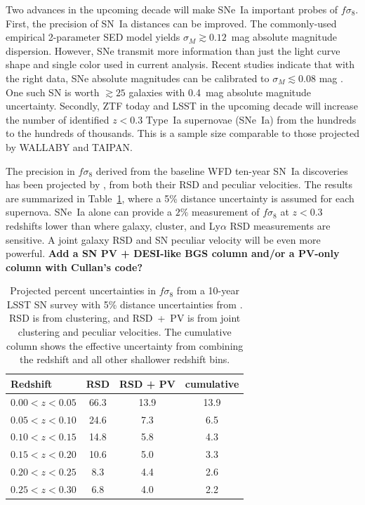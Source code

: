 \documentclass{aastex62}   	%
\begin{document}
Two advances in the upcoming decade will make SNe~Ia  important probes of $f\sigma_8$.
First, the precision of SN~Ia distances can be improved.  The commonly-used empirical 2-parameter SED model yields $\sigma_M \gtrsim 0.12$~mag absolute magnitude
dispersion.  However, SNe transmit more information than just the light curve shape and single color used in current analysis.
Recent studies indicate that with the right data, SNe absolute
magnitudes can be calibrated to $\sigma_M \lesssim 0.08$ mag \citep[see e.g.][]{2012MNRAS.425.1007B, 2015ApJ...815...58F}.
One such SN is worth $\gtrsim 25$ galaxies with 0.4~mag absolute magnitude uncertainty.
Secondly,  ZTF today and LSST in the upcoming decade will increase the number of identified  $z<0.3$ Type~Ia supernovae (SNe~Ia)  from the hundreds to the
hundreds of thousands.  This is a sample size comparable to those projected by WALLABY and TAIPAN.

The precision in  $f\sigma_8$ derived from the baseline WFD ten-year SN~Ia discoveries has been projected by \citet{2017ApJ...847..128H},
from both their RSD and peculiar velocities.
The results are summarized in Table~\ref{tab:howlett}, where a 5\% distance uncertainty is assumed for each supernova.
SNe~Ia alone can provide a $2\%$ measurement of $f\sigma_8$ at $z<0.3$ redshifts lower than where galaxy, cluster, and Ly$\alpha$
RSD measurements are sensitive.  A joint galaxy RSD and SN peculiar velocity will be even more powerful.
{\bf Add a SN PV + DESI-like BGS column and/or a PV-only column with Cullan's code? }

\begin{table}
   \centering
   \begin{tabular}{@{} lccc @{}} %
	\hline
	Redshift & RSD & RSD + PV & cumulative\\ \hline
      $0.00<z<0.05$   & 66.3 & 13.9 & 13.9\\
     $0.05<z<0.10$            & 24.6     &  7.3 & 6.5\\
     $0.10<z<0.15$      & 14.8  & 5.8 & 4.3\\
     $0.15<z<0.20$      & 10.6  & 5.0 & 3.3\\
      $0.20<z<0.25$     & 8.3  & 4.4 & 2.6\\
     $0.25<z<0.30$  & 6.8  &  4.0 & 2.2\\
      \hline
   \end{tabular}
   \caption{Projected percent uncertainties in $f\sigma_8$ from a 10-year LSST SN survey with 5\% distance uncertainties from
   \citet{2017ApJ...847..128H}. RSD is from clustering, and RSD~+~PV is from joint clustering and peculiar velocities.
   The cumulative column shows the effective uncertainty from combining the redshift and all other shallower redshift bins.}
   \label{tab:howlett}
\end{table}
\end{document}
